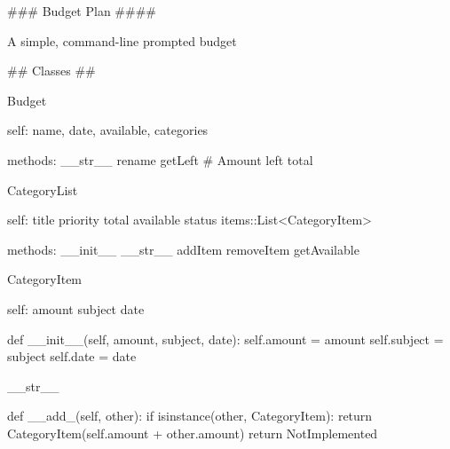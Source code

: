 ### Budget Plan ####

A simple, command-line prompted budget

## Classes ##

Budget {
    self: name, date, available, categories

    methods: 
        __str__
        rename
        getLeft  # Amount left total

}

CategoryList {
    self:
        title
        priority
        total
        available
        status
        items::List<CategoryItem>

    methods:
        __init__
        __str__
        addItem
        removeItem
        getAvailable

}

CategoryItem {
    self:
        amount
        subject
        date

    def __init__(self, amount, subject, date):
            self.amount = amount
            self.subject = subject
            self.date = date
            


    __str__

    def __add_(self, other):
        if isinstance(other, CategoryItem):
            return CategoryItem(self.amount + other.amount)
        return NotImplemented

}